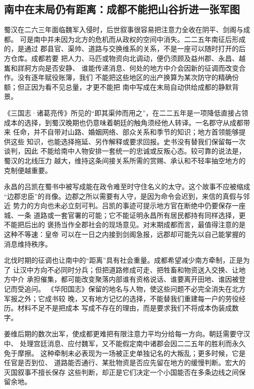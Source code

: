 \subsection{南中在末局仍有距离：成都不能把山谷折进一张军图}

蜀汉在二六三年面临魏军入侵时，后世叙事很容易把注意力全收在阴平、剑阁与成都。
可是南中并未因为北方的危机而从政权的空间中消失。二二五年南征后形成的，是通过
郡县官、渠帅、道路与交换维系的关系，不是一座可以随时打开的后方仓库。成都若要
把人力、马匹或物资向北调动，便仍须顾及益州郡、永昌、越巂和牂牁方向是否安静、
谁能传递消息、何处的地方中介会因新的征调而改变合作。没有逐年赋役账簿，我们
不能把这些地区的出产换算为某次防守的精确份额；但正因为看不见总量，才更不能把
南中写成在末局自动供给成都的静默背景。

《三国志·诸葛亮传》所见的“即其渠帅而用之”，在二二五年是一项降低直接占领
成本的选择，到蜀汉晚期也仍意味着朝廷的触角须经他人转译。一名郡守从成都带来
任命，并不自带对山路、婚姻网络、部众关系和季节的知识；地方首领能够提供这些
知识，也能选择拖延、另作解释或要求回报。史书没有替我们保留每一次谈判，因此
不能给南中人物安排一套统一的忠诚或反叛心态。较可靠的说法是，蜀汉的北线压力
越大，维持这条间接关系所需的赏赐、承认和不轻率抽空地方的克制便越重要。

永昌的吕凯在蜀书中被写成能在政令难至时守住名义的太守。这个故事不应被缩成
“边郡忠臣”的肖像。边郡之所以需要有人守，是因为命令会迟到，来信的真假与邻近
势力的方向也未必立刻可判。吕凯的事迹可提示地方官在断绝中仍要保存一座城、一条
道路或一套官署的可能；它不能证明永昌所有居民都持有同样选择，更不能把后出的
褒扬当作全郡社会的现场意见。对末期成都而言，最值得注意的是这种不等速：皇帝
可以在一日之内接到剑阁急报，远郡却可能先以自己能掌握的消息维持秩序。

北伐时期的征调也让南中的“距离”具有社会重量。成都希望减少南方牵制，正是为了
让汉中方向不必同时分兵；但把道路修成可走、把牲畜和物资送入交换、让地方中介
承担催集，都可能改变聚落内部谁有资格说话、谁要离开田地、谁因被登记而受追问。
《华阳国志》保留的地名与人物，使这些问题不必完全消失在北方军报之外；它成书较
晚，又有地方记忆的选择，不能替我们重建每一户的劳役经历。材料不足不是把成本
写成不存在的理由，而是要求我们不将成本伪装成数字。

姜维后期的数次出军，使成都更难把有限注意力平均分给每一方向。朝廷需要守汉中、
处理宫廷消息、应付魏军，又不能假定南中诸郡会因二二五年的胜利而永久免于摩擦。
这种牵制未必表现为一场被正史单独记名的大叛乱；更多时候，它是任官是否到位、
道路能否通行、某批物资是否应先留在地方的缓慢判断。宏大的灭国叙事不擅长保存
这些判断，却正是它们决定一个小国能否在多条边线之间保留余地。

